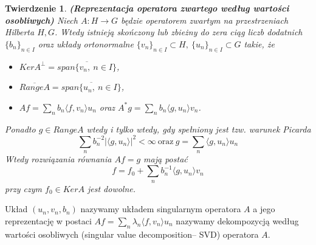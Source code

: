 \documentclass[10pt]{mwart}
\newtheorem{tw}{Twierdzenie}
\begin{document}
\begin{tw}{\textbf{(Reprezentacja operatora zwartego według wartości osobliwych)}}
Niech $A\colon H\to G$ będzie operatorem zwartym na przestrzeniach Hilberta $H,G$. Wtedy istnieją skończony lub zbieżny do zera ciąg liczb dodatnich $\{b_n\}_{n\in I}$ oraz układy ortonormalne $\{v_n\}_{n\in I}\subset H,\ \{u_n\}_{n\in I}\subset G$ takie, że
\begin{itemize}
\item $KerA^{\perp}=\overline{span\{v_n,\ n\in I\}}$,
\item $\overline{RangeA}=\overline{span\{u_n,\ n\in I\}}$,
\item $Af=\sum_nb_n\langle f, v_n\rangle u_n$ oraz $A^*g=\sum_nb_n\langle g, u_n\rangle v_n$.
\end{itemize}
Ponadto $g\in RangeA$ wtedy i tylko wtedy, gdy spełniony jest tzw. warunek Picarda
\begin{displaymath} 
\sum_nb_n^{-2}|\langle g, u_n\rangle|^2< \infty\ \textrm{oraz}\ g=\sum_n\langle g, u_n\rangle u_n
\end{displaymath}
Wtedy rozwiązania równania $Af=g$ mają postać 
\begin{displaymath}
f=f_0+\sum_nb_n^{-1}\langle g, u_n\rangle v_n
\end{displaymath}
przy czym $f_0\in KerA$ jest dowolne.
\end{tw}
Układ $(u_n,v_n,b_n)$ nazywamy układem singularnym operatora $A$ a jego reprezentację w postaci $Af=\sum_n\lambda_n\langle f,v_n\rangle u_n$ nazywamy dekompozycją według wartości osobliwych (singular value decomposition-- SVD) operatora $A$.
\end{document}

